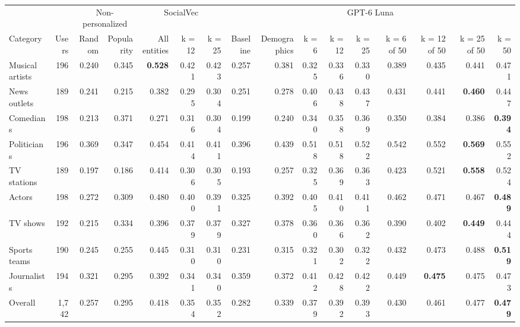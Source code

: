 \begin{tabular}{lrrrrrrrrrrrrrrr}
\toprule
 &  & \multicolumn{2}{c}{Non-personalized} & \multicolumn{3}{c}{SocialVec} & \multicolumn{9}{c}{GPT-6 Luna} \\
Category & Users & Random & Popularity & All entities & k = 12 & k = 25 & Baseline & Demographics & k = 6 & k = 12 & k = 25 & k = 6 of 50 & k = 12 of 50 & k = 25 of 50 & k = 50 \\
\midrule
Musical artists & 196 & 0.240 & 0.345 & \textbf{0.528} & 0.421 & 0.423 & 0.257 & 0.381 & 0.325 & 0.336 & 0.330 & 0.389 & 0.435 & 0.441 & 0.471 \\
News outlets & 189 & 0.241 & 0.215 & 0.382 & 0.295 & 0.304 & 0.251 & 0.278 & 0.406 & 0.438 & 0.437 & 0.431 & 0.441 & \textbf{0.460} & 0.447 \\
Comedians & 198 & 0.213 & 0.371 & 0.271 & 0.316 & 0.304 & 0.199 & 0.240 & 0.340 & 0.358 & 0.369 & 0.350 & 0.384 & 0.386 & \textbf{0.394} \\
Politicians & 196 & 0.369 & 0.347 & 0.454 & 0.414 & 0.411 & 0.396 & 0.439 & 0.518 & 0.518 & 0.522 & 0.542 & 0.552 & \textbf{0.569} & 0.552 \\
TV stations & 189 & 0.197 & 0.186 & 0.414 & 0.306 & 0.305 & 0.193 & 0.257 & 0.325 & 0.369 & 0.363 & 0.423 & 0.521 & \textbf{0.558} & 0.524 \\
Actors & 198 & 0.272 & 0.309 & 0.480 & 0.400 & 0.391 & 0.325 & 0.392 & 0.405 & 0.410 & 0.411 & 0.462 & 0.471 & 0.467 & \textbf{0.489} \\
TV shows & 192 & 0.215 & 0.334 & 0.396 & 0.379 & 0.379 & 0.327 & 0.378 & 0.360 & 0.366 & 0.362 & 0.390 & 0.402 & \textbf{0.449} & 0.444 \\
Sports teams & 190 & 0.245 & 0.255 & 0.445 & 0.310 & 0.310 & 0.231 & 0.315 & 0.321 & 0.302 & 0.322 & 0.432 & 0.473 & 0.488 & \textbf{0.519} \\
Journalists & 194 & 0.321 & 0.295 & 0.392 & 0.341 & 0.340 & 0.359 & 0.372 & 0.412 & 0.428 & 0.422 & 0.449 & \textbf{0.475} & 0.475 & 0.473 \\
\midrule
Overall & 1,742 & 0.257 & 0.295 & 0.418 & 0.354 & 0.352 & 0.282 & 0.339 & 0.379 & 0.392 & 0.393 & 0.430 & 0.461 & 0.477 & \textbf{0.479} \\
\bottomrule
\end{tabular}
